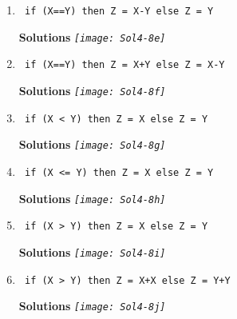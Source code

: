 \begin{enumerate}
\begin{enumerate}
                    \item \verb^ if (X==Y) then Z = X-Y else Z = Y ^

                        \begin{onlysolution} \textbf{Solutions} \itshape{
                                \texttt{[image: Sol4-8e]}
                            }
                        \end{onlysolution}

                    \item \verb^ if (X==Y) then Z = X+Y else Z = X-Y ^

                        \begin{onlysolution} \textbf{Solutions} \itshape{
                                \texttt{[image: Sol4-8f]}
                            }
                        \end{onlysolution}

                    \item \verb^ if (X < Y) then Z = X else Z = Y ^

                        \begin{onlysolution} \textbf{Solutions} \itshape{
                                \texttt{[image: Sol4-8g]}
                            }
                        \end{onlysolution}

                    \item \verb^ if (X <= Y) then Z = X else Z = Y ^

                        \begin{onlysolution} \textbf{Solutions} \itshape{
                                \texttt{[image: Sol4-8h]}
                            }
                        \end{onlysolution}

                    \item \verb^ if (X > Y) then Z = X else Z = Y ^

                        \begin{onlysolution} \textbf{Solutions} \itshape{
                                \texttt{[image: Sol4-8i]}
                            }
                        \end{onlysolution}

                    \item \verb^ if (X > Y) then Z = X+X else Z = Y+Y ^

                        \begin{onlysolution} \textbf{Solutions} \itshape{
                                \texttt{[image: Sol4-8j]}
                            }
                        \end{onlysolution}


\end{enumerate}
\end{enumerate}

